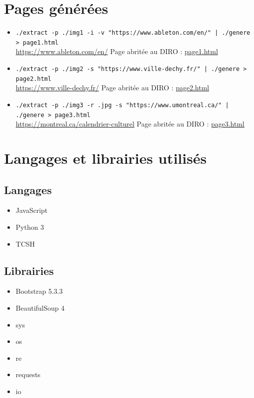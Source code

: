 \documentclass{article}
\begin{document}
\section{Pages générées}
\begin{itemize}
  \item \texttt{./extract -p ./img1 -i -v "https://www.ableton.com/en/" | ./genere > page1.html} \\
  \url{https://www.ableton.com/en/} \qquad Page abritée au DIRO : \href{https://www-ens.iro.umontreal.ca/hiver/~boulogny/page1.html}{page1.html}
  \item \texttt{./extract -p ./img2 -s "https://www.ville-dechy.fr/" | ./genere > page2.html} \\
  \url{https://www.ville-dechy.fr/} \qquad Page abritée au DIRO : \href{https://www-ens.iro.umontreal.ca/hiver/~boulogny/page2.html}{page2.html}
  \item \texttt{./extract -p ./img3 -r .jpg -s  "https://www.umontreal.ca/" | ./genere > page3.html} \\
  \url{https://montreal.ca/calendrier-culturel} \qquad Page abritée au DIRO : \href{https://www-ens.iro.umontreal.ca/hiver/~boulogny/page3.html}{page3.html}
\end{itemize}

\newpage
\section{Langages et librairies utilisés}
\subsection{Langages}
\begin{itemize}
  \item JavaScript
  \item Python 3
  \item TCSH
\end{itemize}
\subsection{Librairies}
\begin{itemize}  
  \item Bootstrap 5.3.3
  \item BeautifulSoup 4
  \item sys
  \item os
  \item re
  \item requests
  \item io
\end{itemize}
\end{document}
